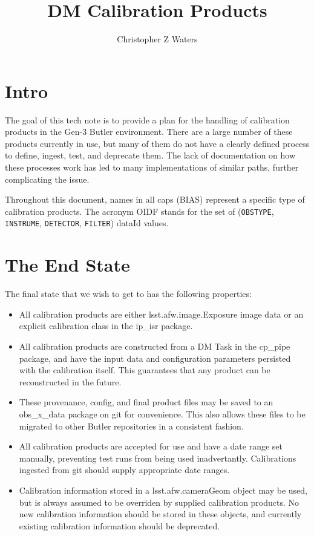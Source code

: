 \documentclass[DM,authoryear,toc]{lsstdoc}
\title{DM Calibration Products}
\author{%
Christopher Z Waters
}
\date{\vcsDate}
\begin{document}
\maketitle


\section{Intro}

The goal of this tech note is to provide a plan for the handling of
calibration products in the Gen-3 Butler environment.  There are a
large number of these products currently in use, but many of them do
not have a clearly defined process to define, ingest, test, and
deprecate them.  The lack of documentation on how these processes work
has led to many implementations of similar paths, further complicating
the issue.

Throughout this document, names in all caps (BIAS) represent a
specific type of calibration products.  The acronym OIDF stands for
the set of (\verb|OBSTYPE|, \verb|INSTRUME|, \verb|DETECTOR|,
\verb|FILTER|) dataId values.

\section{The End State}

The final state that we wish to get to has the following properties:

\begin{itemize}
\item All calibration products are either lsst.afw.image.Exposure
  image data or an explicit calibration class in the ip_isr package.
\item All calibration products are constructed from a DM Task in the
  cp_pipe package, and have the input data and configuration
  parameters persisted with the calibration itself.  This guarantees
  that any product can be reconstructed in the future.
\item These provenance, config, and final product files may be saved
  to an obs_x_data package on git for convenience.  This also allows
  these files to be migrated to other Butler repositories in a
  consistent fashion.
\item All calibration products are accepted for use and have a date
  range set manually, preventing test runs from being used
  inadvertantly.  Calibrations ingested from git should supply
  appropriate date ranges.
\item Calibration information stored in a lsst.afw.cameraGeom object
  may be used, but is always assumed to be overriden by supplied
  calibration products.  No new calibration information should be
  stored in these objects, and currently existing calibration
  information should be deprecated.

\end{itemize}
\end{document}
